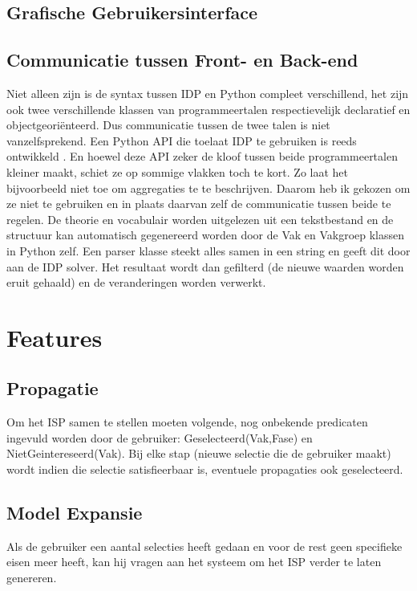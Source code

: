 \subsection{Grafische Gebruikersinterface}



\subsection{Communicatie tussen Front- en Back-end}
Niet alleen zijn is de syntax tussen IDP en Python compleet verschillend, het zijn ook twee verschillende klassen van programmeertalen respectievelijk declaratief en objectgeori\"{e}nteerd. Dus communicatie tussen de twee talen is niet vanzelfsprekend. Een Python API die toelaat IDP te gebruiken is reeds ontwikkeld \citep{vennekens2015lowering}. En hoewel deze API zeker de kloof tussen beide programmeertalen kleiner maakt, schiet ze op sommige vlakken toch te kort. Zo laat het bijvoorbeeld niet toe om aggregaties te te beschrijven. Daarom heb ik gekozen om ze niet te gebruiken en in plaats daarvan zelf de communicatie tussen beide te regelen. De theorie en vocabulair worden uitgelezen uit een tekstbestand en de structuur kan automatisch gegenereerd worden door de Vak en Vakgroep klassen in Python zelf. Een parser klasse steekt alles samen in een string en geeft dit door aan de IDP solver. Het resultaat wordt dan gefilterd (de nieuwe waarden worden eruit gehaald) en de veranderingen worden verwerkt. 

\section{Features}

\subsection{Propagatie}
Om het ISP samen te stellen moeten volgende, nog onbekende predicaten ingevuld worden door de gebruiker: Geselecteerd(Vak,Fase) en NietGeintereseerd(Vak). Bij elke stap (nieuwe selectie die de gebruiker maakt) wordt indien die selectie satisfieerbaar is, eventuele propagaties ook geselecteerd. 

\subsection{Model Expansie}
Als de gebruiker een aantal selecties heeft gedaan en voor de rest geen specifieke eisen meer heeft, kan hij vragen aan het systeem om het ISP verder te laten genereren. 

